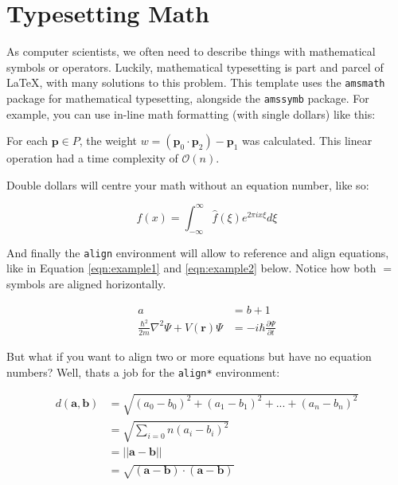 \section{Typesetting Math}
As computer scientists, we often need to describe things with mathematical symbols or operators. Luckily, mathematical typesetting is part and parcel of \LaTeX, with many solutions to this problem. This template uses the \texttt{amsmath} package for mathematical typesetting, alongside the \texttt{amssymb} package. For example, you can use in-line math formatting (with single dollars) like this:

\begin{framed}
For each $\mathbf{p} \in P$, the weight $w = \left( \mathbf{p}_0 \cdot \mathbf{p}_2 \right) - \mathbf{p}_1$ was calculated. This linear operation had a time complexity of $\mathcal{O}(n)$.
\end{framed}

Double dollars will centre your math without an equation number, like so:

\begin{framed}
$$ f(x) = \int_{-\infty}^{\infty}{\hat{f}(\xi)e^{2\pi i x \xi}d\xi} $$
\end{framed}

And finally the \texttt{align} environment will allow to reference and align equations, like in Equation \ref{eqn:example1} and \ref{eqn:example2} below. Notice how both $=$ symbols are aligned horizontally.

\begin{framed}
\begin{align}
a &= b + 1 
\label{eqn:example1} \\
\frac{\hbar^2}{2m}\nabla^2\Psi + V(\mathbf{r})\Psi
&= -i\hbar \frac{\partial\Psi}{\partial t}    
\label{eqn:example2}
\end{align}
\end{framed}

But what if you want to align two or more equations but have no equation numbers? Well, thats a job for the \texttt{align*} environment:

\begin{framed}
\begin{align*}
d(\mathbf{a}, \mathbf{b}) &= \sqrt{(a_0 - b_0)^2 + (a_1 - b_1)^2 + ... + (a_n - b_n)^2} \\
        &= \sqrt{\sum_{i=0}{n}{(a_i - b_i)^2}} \\
        &= || \mathbf{a} - \mathbf{b} || \\
        &= \sqrt{(\mathbf{a} - \mathbf{b}) \cdot (\mathbf{a} - \mathbf{b})}
\end{align*}
\end{framed}


